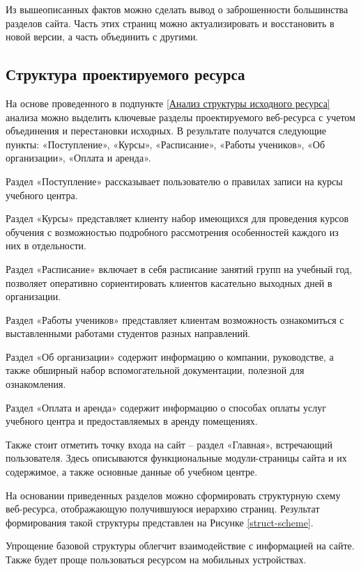 Из вышеописанных фактов можно сделать вывод о заброшенности большинства разделов сайта.
Часть этих страниц можно актуализировать и восстановить в новой версии, а часть объединить с другими.


\subsection{Структура проектируемого ресурса}

На основе проведенного в подпункте \ref{Анализ структуры исходного ресурса} анализа можно выделить ключевые разделы проектируемого веб-ресурса с учетом объединения и перестановки исходных.
В результате получатся следующие пункты: «Поступление», «Курсы», «Расписание», «Работы учеников», «Об организации», «Оплата и аренда».

Раздел «Поступление» рассказывает пользователю о правилах записи на курсы учебного центра.

Раздел «Курсы» представляет клиенту набор имеющихся для проведения курсов обучения с возможностью подробного рассмотрения особенностей каждого из них в отдельности.

Раздел «Расписание» включает в себя расписание занятий групп на учебный год, позволяет оперативно сориентировать клиентов касательно выходных дней в организации.

Раздел «Работы учеников» представляет клиентам возможность ознакомиться с выставленными работами студентов разных направлений.

Раздел «Об организации» содержит информацию о компании, руководстве, а также обширный набор вспомогательной документации, полезной для ознакомления.

Раздел «Оплата и аренда» содержит информацию о способах оплаты услуг учебного центра и предоставляемых в аренду помещениях.

Также стоит отметить точку входа на сайт -- раздел «Главная», встречающий пользователя.
Здесь описываются функциональные модули-страницы сайта и их содержимое, а также основные данные об учебном центре.

На основании приведенных разделов можно сформировать структурную схему веб-ресурса, отображающую получившуюся иерархию страниц.
Результат формирования такой структуры представлен на Рисунке \ref{struct-scheme}.


Упрощение базовой структуры облегчит взаимодействие с информацией на сайте.
Также будет проще пользоваться ресурсом на мобильных устройствах.


